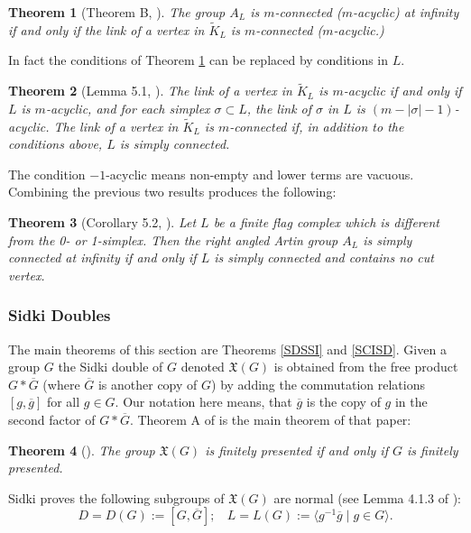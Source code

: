 \documentclass[12pt]{article}
\newtheorem{theorem}{Theorem}[subsection]
\begin{document}
\begin{theorem} [Theorem B, \cite{BrM01}] \label{BRMB}
The group $A_L$ is $m$-connected ($m$-acyclic) at infinity if and only if the link of a vertex in $\tilde K_L$ is $m$-connected ($m$-acyclic.) 
\end{theorem} 
In fact the conditions of Theorem \ref{BRMB} can be replaced by conditions in $L$. 

\begin{theorem} [Lemma 5.1, \cite{BrM01}]The link of a vertex in $\tilde K_L$ is $m$-acyclic if and only if $L$ is $m$-acyclic, and for each simplex $\sigma\subset L$, the link of $\sigma$ in $L$ is $(m-|\sigma|-1)$-acyclic. The link of a vertex in $\tilde K_L$ is $m$-connected if, in addition to the conditions above, $L$ is simply connected. 
\end{theorem}
The condition $-1$-acyclic means non-empty and lower terms are vacuous. Combining the previous two results produces the following:
\begin{theorem} [Corollary 5.2, \cite{BrM01}] Let $L$ be a finite flag complex which is different from the 0- or 1-simplex. Then the right angled Artin group $A_L$  is simply connected at infinity if and only if $L$ is simply connected and contains no cut vertex.
\end{theorem} 


\subsubsection{Sidki Doubles} \label{Sed}
The main theorems of this section are Theorems \ref{SDSSI} and \ref{SCISD}. 
Given a group $G$ the Sidki double of $G$ denoted $\mathfrak{X} (G)$ is obtained from the free product $G\ast \overline G$ (where $\overline G$ is another copy of $G$) by adding the commutation relations $[g,\overline g]$ for all $g\in G$. Our notation here means, that $\overline g$ is the copy of $g$ in the second factor of $G\ast \overline G$. 
Theorem A of \cite{BK19} is the main theorem of that paper:

\begin{theorem} [\cite{BK19}] \label{MainBK} 
The group $\mathfrak{X}(G)$ is finitely presented if and only if $G$ is finitely presented.
\end{theorem}

Sidki proves the following subgroups of $\mathfrak{X} (G)$ are normal (see Lemma 4.1.3 of \cite{Sid80}):
$$D=D(G):=[G,\overline G];\ \ \ \ L=L(G):= \langle g^{-1}\overline g\mid g\in G\rangle.$$
\end{document}
